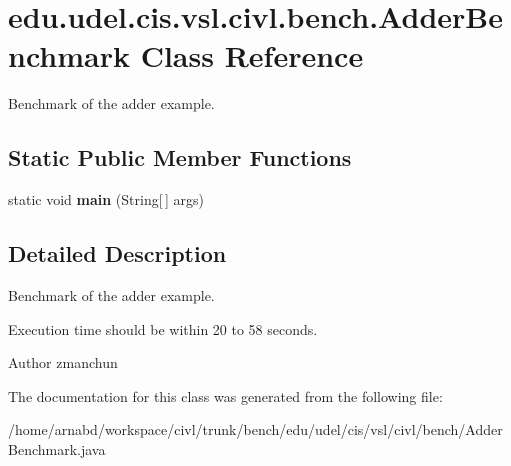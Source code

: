 \hypertarget{classedu_1_1udel_1_1cis_1_1vsl_1_1civl_1_1bench_1_1AdderBenchmark}{}\section{edu.\+udel.\+cis.\+vsl.\+civl.\+bench.\+Adder\+Benchmark Class Reference}
\label{classedu_1_1udel_1_1cis_1_1vsl_1_1civl_1_1bench_1_1AdderBenchmark}


Benchmark of the adder example.  


\subsection*{Static Public Member Functions}
\begin{DoxyCompactItemize}
\item 
\hypertarget{classedu_1_1udel_1_1cis_1_1vsl_1_1civl_1_1bench_1_1AdderBenchmark_a778c6a5c2b546af54296f89139a0ef91}{}static void {\bfseries main} (String\mbox{[}$\,$\mbox{]} args)\label{classedu_1_1udel_1_1cis_1_1vsl_1_1civl_1_1bench_1_1AdderBenchmark_a778c6a5c2b546af54296f89139a0ef91}

\end{DoxyCompactItemize}


\subsection{Detailed Description}
Benchmark of the adder example. 

Execution time should be within 20 to 58 seconds.

\begin{DoxyAuthor}{Author}
zmanchun 
\end{DoxyAuthor}


The documentation for this class was generated from the following file\+:\begin{DoxyCompactItemize}
\item 
/home/arnabd/workspace/civl/trunk/bench/edu/udel/cis/vsl/civl/bench/Adder\+Benchmark.\+java\end{DoxyCompactItemize}
